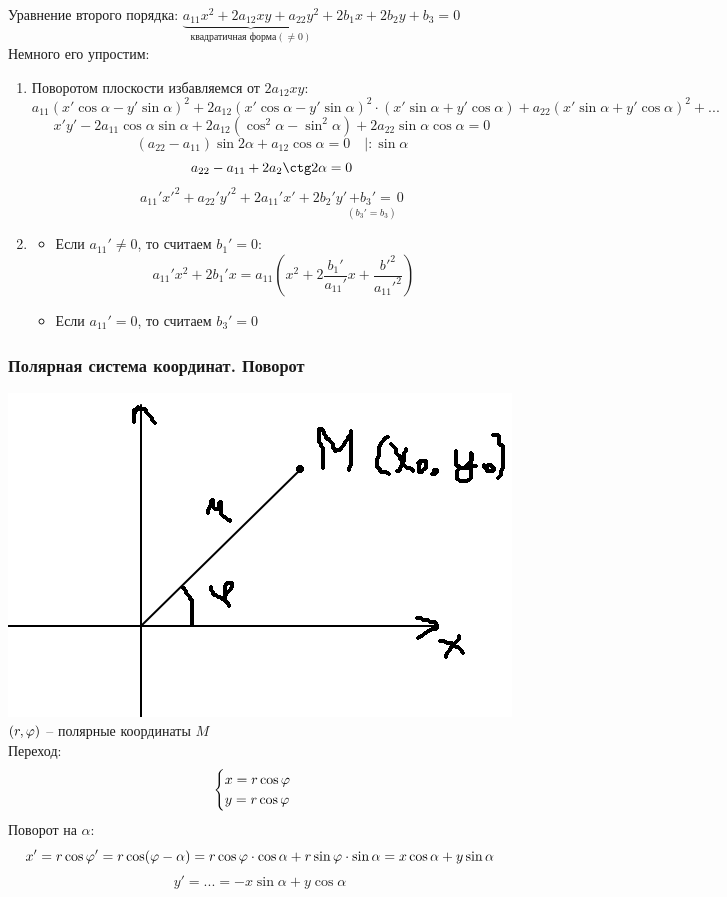 Уравнение второго порядка: $ \underbrace{a_{11} x^2 + 2 a_{12} xy + a_{22} y^2}_{\text{квадратичная форма} (\ne 0)} + 2b_1 x + 2b_2 y + b_3 = 0 $ \\
Немного его упростим:
\begin{enumerate}
    \item Поворотом плоскости избавляемся от $ 2 a_{12} xy $:
    $$ a_{11} (x' \cos \alpha - y' \sin \alpha)^2 + 2 a_{12} (x' \cos \alpha - y' \sin \alpha)^2 \cdot (x' \sin \alpha + y' \cos \alpha) + a_{22} (x' \sin \alpha + y' \cos \alpha)^2 + ... $$
    $$ x'y' - 2a_{11} \cos \alpha \sin \alpha + 2 a_{12} (\cos^2 \alpha - \sin^2 \alpha) + 2 a_{22} \sin \alpha \cos \alpha = 0 $$
    $$ (a_{22} - a_{11}) \sin 2 \alpha + a_{12} \cos \alpha = 0 \quad | : \sin \alpha $$
    $$ a_{22} - a_{11} + 2 a_2 \ctg 2 \alpha = 0 $$
    $$ a_{11}' x'^2 + a_{22}' y'^2 + 2a_{11}'x' + 2b_2'y' \underset{(b_3' = b_3)}{ + b_3' = } 0 $$
    \item \begin{itemize}
        \item Если $a_{11}' \ne 0 $, то считаем $b_1' = 0$:
        $$ a_{11}'x^2 + 2b_1'x = a_{11} (x^2 + 2 \frac{b_1'}{a_{11}'}x + \frac{b'^2}{a_{11}'^2}) $$
        \item Если $a_{11}' = 0$, то считаем $b_3' = 0$
          \end{itemize}

\end{enumerate}

\subsubsection{Полярная система координат. Поворот}
\includegraphics[scale=0.8]{2} \\
$ (r, \varphi) $ -- полярные координаты $ M $ \\
Переход:
$$ \begin{cases} x = r \cos \varphi \\ y = r \cos \varphi \end{cases} $$
Поворот на $\alpha$:
$$ x' = r \cos \varphi' = r \cos (\varphi - \alpha) = r \cos \varphi \cdot \cos \alpha + r \sin \varphi \cdot \sin \alpha = x \cos \alpha + y \sin \alpha $$
$$ y' = ... = - x \sin \alpha + y \cos \alpha $$
